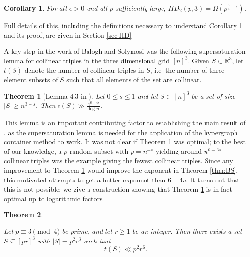 \documentclass[11pt]{amsart}
\newtheorem{theorem}{Theorem}
\newtheorem{corollary}{Corollary}
\theoremstyle{remark}
\begin{document}
\begin{corollary} \label{cor:HD2}
    For all $\epsilon >0$ and all $p$ sufficiently large, $HD_2(p,3) = \Omega( p^{\frac{5}{4}- \epsilon})$.
\end{corollary}
Full details of this, including the definitions necessary to understand Corollary \ref{cor:HD2} and its proof, are given in Section \ref{sec:HD}.

A key step in the work of Balogh and Solymosi was the following supersaturation lemma for collinear triples in the three dimensional grid $[n]^3$. Given $S \subset \mathbb R^3$, let $t(S)$ denote the number of collinear triples in $S$, i.e. the number of three-element subsets of $S$ such that all elements of the set are collinear.

\begin{theorem}[Lemma 4.3 in \cite{BaSo}] \label{thm:ssl}
    Let $0 \leq s \leq 1$ and let $S \subset [n]^3$ be a set of size $|S|\geq n^{3-s}$. Then $t(S) \gg \frac{n^{6-4s}}{\log n}$.
\end{theorem}

This lemma is an important contributing factor to establishing the main result of \cite{BaSo}, as the supersaturation lemma is needed for the application of the hypergraph container method to work. It was not clear if Theorem \ref{thm:ssl} was optimal; to the best of our knowledge, a $p$-random subset with $p=n^{-s}$ yielding around $n^{6-3s}$ collinear triples was the example giving the fewest collinear triples. Since any improvement to Theorem \ref{thm:ssl} would improve the exponent in Theorem \ref{thm:BS}, this motivated attempts to get a better exponent than $6-4s$. It turns out that this is not possible; we give a construction showing that Theorem \ref{thm:ssl} is in fact optimal up to logarithmic factors.

    

\begin{theorem} \label{thm:main}

     Let $p\equiv 3 \pmod 4$ be prime, and let $r\ge 1$ be an integer. Then there exists a set $S\subseteq [pr]^3$ with $ |S|=p^2r^3$ such that
\[
t(S)\ll p^2r^6.
\]



\end{theorem}
\end{document}
